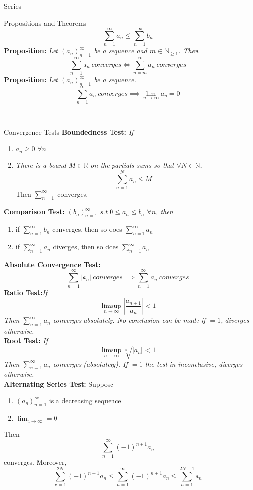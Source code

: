 \documentclass{article}
\begin{document}
\begin{multicols*}{3}
\begin{blackbox}{Series}
\begin{bluebox}{Propositions and Theorems}
        \[\sum_{n=1}^\infty a_n \leq \sum_{n=1}^\infty b_n\]
        \textbf{Proposition:}\textit{ Let $(a_n)_{n=1}^\infty$ be a sequence and $m \in \mathbb{N}_{\geq 1}$. Then}\\[-2ex]
        \[\sum_{n=1}^\infty a_n \ converges \iff \sum_{n=m}^\infty a_n \ converges\]
        \textbf{Proposition:}\textit{ Let $(a_n)_{n=1}^\infty$ be a sequence.}\\[-2ex]
        \[\sum_{n=1}^\infty a_n \ converges \implies \lim_{n\rightarrow \infty} a_n = 0\]
    \end{bluebox}\\[-3ex]
\end{blackbox}
\begin{blackbox}{Convergence Tests}
    \textbf{Boundedness Test:}\textit{ If}
        \begin{enumerate}[label=(\roman*)]
            \item $a_n \geq 0$ $\forall n$
            \item \textit{There is a bound $M \in \mathbb{R}$ on the partials sums so that $\forall N \in \mathbb{N}$,}
            \[\sum_{n=1}^N a_n \leq M\]
            Then $\sum_{n=1}^\infty$ converges.
        \end{enumerate}
         \textbf{Comparison Test:}\textit{ $(b_n)_{n=1}^\infty$ s.t $0 \leq a_n \leq b_n$ $\forall n$, then}
            \begin{enumerate}[label=(\roman*)]
                \item if $\sum_{n=1}^\infty b_n$ converges, then so does $\sum_{n=1}^\infty a_n$
                \item if $\sum_{n=1}^\infty a_n$ diverges, then so does $\sum_{n=1}^\infty a_n$
            \end{enumerate}
        \textbf{Absolute Convergence Test:}
        \[\sum_{n=1}^\infty |a_n| \ converges \implies \sum_{n=1}^\infty a_n\ converges \]
        \textbf{Ratio Test:}\textit{If}
            \[\limsup_{n\rightarrow\infty} \left| \frac{a_{n+1}}{a_n} \right| < 1\]
            \textit{Then $\sum_{n=1}^\infty a_n$ converges absolutely. No conclusion can be made if $=1$, diverges otherwise.}\\[2.5ex]
            \textbf{Root Test:}\textit{ If}
            \[\limsup_{n\rightarrow\infty} \sqrt[n]{|a_n|} < 1\]
            \textit{Then $\sum_{n=1}^\infty a_n$ converges (absolutely). If $=1$ the test in inconclusive, diverges otherwise.}\\[2.5ex]
            \textbf{Alternating Series Test:} Suppose
            \begin{enumerate}[label=(\roman*)]
                \item $(a_n)_{n=1}^\infty$ is a decreasing sequence
                \item $\lim_{n\rightarrow \infty} = 0$
            \end{enumerate}
            Then
            \[\sum_{n=1}^\infty (-1)^{n+1}a_n\]
            converges.  Moreover, 
        \[\sum_{n=1}^{2N} (-1)^{n+1} a_n \leq \sum_{n=1}^\infty (-1)^{n+1}a_n \leq \sum_{n=1}^{2N - 1}a_n\]
        

\end{blackbox}
\end{multicols*}
\end{document}
